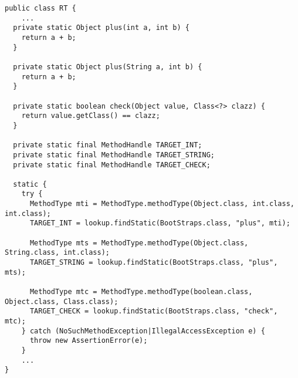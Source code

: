 {\tiny \begin{verbatim}
public class RT {
    ...
  private static Object plus(int a, int b) {
    return a + b;
  }

  private static Object plus(String a, int b) {
    return a + b;
  }

  private static boolean check(Object value, Class<?> clazz) {
    return value.getClass() == clazz;
  }

  private static final MethodHandle TARGET_INT;
  private static final MethodHandle TARGET_STRING;
  private static final MethodHandle TARGET_CHECK;

  static {
    try {
      MethodType mti = MethodType.methodType(Object.class, int.class, int.class);
      TARGET_INT = lookup.findStatic(BootStraps.class, "plus", mti);

      MethodType mts = MethodType.methodType(Object.class, String.class, int.class);
      TARGET_STRING = lookup.findStatic(BootStraps.class, "plus", mts);

      MethodType mtc = MethodType.methodType(boolean.class, Object.class, Class.class);
      TARGET_CHECK = lookup.findStatic(BootStraps.class, "check", mtc);
    } catch (NoSuchMethodException|IllegalAccessException e) {
      throw new AssertionError(e);
    }
    ...
}
\end{verbatim} }
